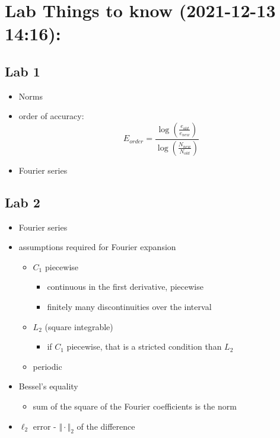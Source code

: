 \documentclass[
]{article}
\author{}
\date{}
\providecommand{\tightlist}{%
  \setlength{\itemsep}{0pt}\setlength{\parskip}{0pt}}
\begin{document}
\hypertarget{lab-things-to-know-2021-12-13-1416}{%
\section{Lab Things to know (2021-12-13
14:16):}\label{lab-things-to-know-2021-12-13-1416}}

\hypertarget{lab-1}{%
\subsection{Lab 1}\label{lab-1}}

\begin{itemize}
\tightlist
\item
  Norms
\item
  order of accuracy: \[
        E_{order} = \frac{
            \log \left( \frac{e_{old}}{ e_{new} } \right)
        }{
            \log \left( \frac{N_{new}}{N_{old}} \right)
        }
    \]
\item
  Fourier series
\end{itemize}

\hypertarget{lab-2}{%
\subsection{Lab 2}\label{lab-2}}

\begin{itemize}
\tightlist
\item
  Fourier series
\item
  assumptions required for Fourier expansion

  \begin{itemize}
  \tightlist
  \item
    \(C_1\) piecewise

    \begin{itemize}
    \tightlist
    \item
      continuous in the first derivative, piecewise
    \item
      finitely many discontinuities over the interval
    \end{itemize}
  \item
    \(L_2\) (square integrable)

    \begin{itemize}
    \tightlist
    \item
      if \(C_1\) piecewise, that is a stricted condition than \(L_2\)
    \end{itemize}
  \item
    periodic
  \end{itemize}
\item
  Bessel's equality

  \begin{itemize}
  \tightlist
  \item
    sum of the square of the Fourier coefficients is the norm
  \end{itemize}
\item
  \(\ell_2\) error - \(\Vert\cdot\Vert_2\) of the difference
\end{itemize}
\end{document}
